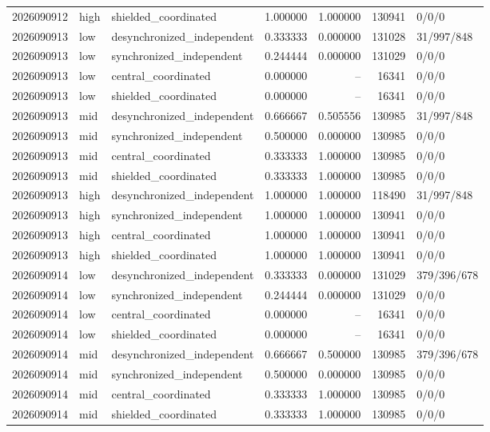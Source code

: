 \begin{longtable}{llp{38mm}rrrp{30mm}}
2026090912 & high & shielded\_coordinated & 1.000000 & 1.000000 & 130941 & 0/0/0 \\
2026090913 & low & desynchronized\_independent & 0.333333 & 0.000000 & 131028 & 31/997/848 \\
2026090913 & low & synchronized\_independent & 0.244444 & 0.000000 & 131029 & 0/0/0 \\
2026090913 & low & central\_coordinated & 0.000000 & -- & 16341 & 0/0/0 \\
2026090913 & low & shielded\_coordinated & 0.000000 & -- & 16341 & 0/0/0 \\
2026090913 & mid & desynchronized\_independent & 0.666667 & 0.505556 & 130985 & 31/997/848 \\
2026090913 & mid & synchronized\_independent & 0.500000 & 0.000000 & 130985 & 0/0/0 \\
2026090913 & mid & central\_coordinated & 0.333333 & 1.000000 & 130985 & 0/0/0 \\
2026090913 & mid & shielded\_coordinated & 0.333333 & 1.000000 & 130985 & 0/0/0 \\
2026090913 & high & desynchronized\_independent & 1.000000 & 1.000000 & 118490 & 31/997/848 \\
2026090913 & high & synchronized\_independent & 1.000000 & 1.000000 & 130941 & 0/0/0 \\
2026090913 & high & central\_coordinated & 1.000000 & 1.000000 & 130941 & 0/0/0 \\
2026090913 & high & shielded\_coordinated & 1.000000 & 1.000000 & 130941 & 0/0/0 \\
2026090914 & low & desynchronized\_independent & 0.333333 & 0.000000 & 131029 & 379/396/678 \\
2026090914 & low & synchronized\_independent & 0.244444 & 0.000000 & 131029 & 0/0/0 \\
2026090914 & low & central\_coordinated & 0.000000 & -- & 16341 & 0/0/0 \\
2026090914 & low & shielded\_coordinated & 0.000000 & -- & 16341 & 0/0/0 \\
2026090914 & mid & desynchronized\_independent & 0.666667 & 0.500000 & 130985 & 379/396/678 \\
2026090914 & mid & synchronized\_independent & 0.500000 & 0.000000 & 130985 & 0/0/0 \\
2026090914 & mid & central\_coordinated & 0.333333 & 1.000000 & 130985 & 0/0/0 \\
2026090914 & mid & shielded\_coordinated & 0.333333 & 1.000000 & 130985 & 0/0/0 \\

\end{longtable}
